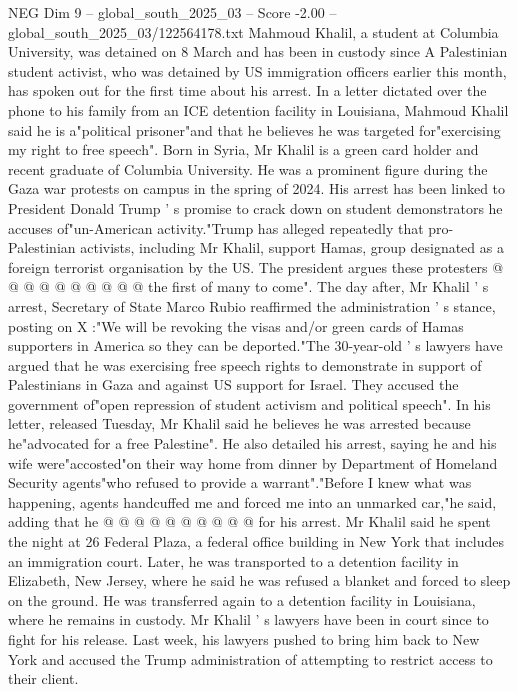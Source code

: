 \begin{textsample}{NEG Dim 9 – global\_south\_2025\_03 – Score -2.00 – global\_south\_2025\_03/122564178.txt}  \label{ex:f9_neg_324}
Mahmoud Khalil, a student at Columbia University, was detained on 8 March and has been in custody since A Palestinian student activist, who was detained by US immigration officers earlier this month, has spoken out for the first time about his arrest.
In a letter dictated over the phone to his family from an ICE detention facility in Louisiana, Mahmoud Khalil said he is a"political prisoner"and that he believes he was targeted for"exercising my right to free speech".
Born in Syria, Mr Khalil is a green card holder and recent graduate of Columbia University.
He was a prominent figure during the Gaza war protests on campus in the spring of 2024.
His arrest has been linked to President Donald Trump ' s promise to crack down on student demonstrators he accuses of"un-American activity."Trump has alleged repeatedly that pro-Palestinian activists, including Mr Khalil, support Hamas, group designated as a foreign terrorist organisation by the US.
The president argues these protesters @ @ @ @ @ @ @ @ @ @ the first of many to come".
The day after, Mr Khalil ' s arrest, Secretary of State Marco Rubio reaffirmed the administration ' s stance, posting on X :"We will be revoking the visas and/or green cards of Hamas supporters in America so they can be deported."The 30-year-old ' s lawyers have argued that he was exercising free speech rights to demonstrate in support of Palestinians in Gaza and against US support for Israel.
They accused the government of"open repression of student activism and political speech".
In his letter, released Tuesday, Mr Khalil said he believes he was arrested because he"advocated for a free Palestine".
He also detailed his arrest, saying he and his wife were"accosted"on their way home from dinner by Department of Homeland Security agents"who refused to provide a warrant"."Before I knew what was happening, agents handcuffed me and forced me into an unmarked car,"he said, adding that he @ @ @ @ @ @ @ @ @ @ for his arrest.
Mr Khalil said he spent the night at 26 Federal Plaza, a federal office building in New York that includes an immigration court.
Later, he was transported to a detention facility in Elizabeth, New Jersey, where he said he was refused a blanket and forced to sleep on the ground.
He was transferred again to a detention facility in Louisiana, where he remains in custody.
Mr Khalil ' s lawyers have been in court since to fight for his release.
Last week, his lawyers pushed to bring him back to New York and accused the Trump administration of attempting to restrict access to their client.

\end{textsample}
